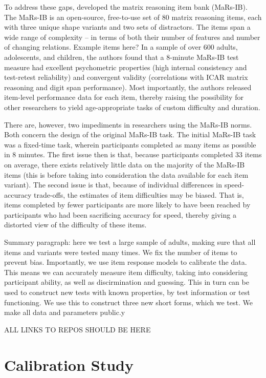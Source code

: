 \documentclass[a4paper,man,natbib]{apa6}
\begin{document}
To address these gaps, \cite{chierchia2019matrix} developed the matrix reasoning item bank (MaRs-IB). The MaRs-IB is an open-source, free-to-use set of 80 matrix reasoning items, each with three unique shape variants and two sets of distractors. The items span a wide range of complexity -- in terms of both their number of features and number of changing relations. Example items here?  In a sample of over 600 adults, adolescents, and children, the authors found that a 8-minute MaRs-IB test measure had excellent psychometric properties (high internal consistency and test-retest reliability) and convergent validity (correlations with ICAR matrix reasoning and digit span performance). Most importantly, the authors released item-level performance data for each item, thereby raising the possibility for other researchers to yield age-appropriate tasks of custom difficulty and duration.

There are, however, two impediments in researchers using the MaRs-IB norms. Both concern the design of the original MaRs-IB task. The initial MaRs-IB task was a fixed-time task, wherein participants completed as many items as possible in 8 minutes. The first issue then is that, because participants completed 33 items on average, there exists relatively little data on the majority of the MaRs-IB items (this is before taking into consideration the data available for each item variant). The second issue is that, because of individual differences in speed-accuracy trade-offs, the estimates of item difficulties may be biased. That is, items completed by fewer participants are more likely to have been reached by participants who had been sacrificing accuracy for speed, thereby giving a distorted view of the difficulty of these items.  

Summary paragraph: here we test a large sample of adults, making sure that all items and variants were tested many times. We fix the number of items to prevent bias. Importantly, we use item response models to calibrate the data. This means we can accurately measure item difficulty, taking into considering participant ability, as well as discirmination and guessing. This in turn can be used to construct new tests with known properties, by test information or test functioning. We use this to construct three new short forms, which we test. We make all data and parameters public.y

ALL LINKS TO REPOS SHOULD BE HERE

\section{Calibration Study}
\end{document}
